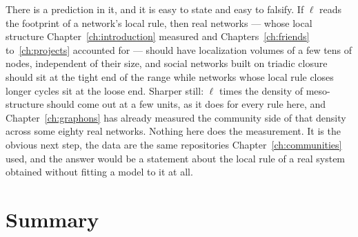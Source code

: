 There is a prediction in it, and it is easy to state and easy to falsify. If $\ell$
reads the footprint of a network's local rule, then real networks --- whose local
structure Chapter~\ref{ch:introduction} measured and Chapters~\ref{ch:friends}
to~\ref{ch:projects} accounted for --- should have localization volumes of a few
tens of nodes, independent of their size, and social networks built on triadic
closure should sit at the tight end of the range while networks whose local rule
closes longer cycles sit at the loose end. Sharper still: $\ell$ times the density of
meso-structure should come out at a few units, as it does for every rule here, and
Chapter~\ref{ch:graphons} has already measured the community side of that density
across some eighty real networks. Nothing here does the measurement. It is the
obvious next step, the data are the same repositories Chapter~\ref{ch:communities}
used, and the answer would be a statement about the local rule of a real system
obtained without fitting a model to it at all.

\section{Summary}

